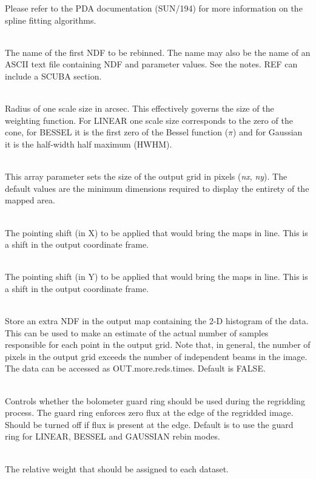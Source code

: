 \documentclass[twoside,11pt]{article}
\newcommand{\htmlref}[2]{#1}
\newcommand{\xref}[3]{#1}
\renewcommand{\_}{\texttt{\symbol{95}}}
\newcommand{\sstsubsection}[1]{ \item[{#1}] \mbox{} \\}
\newcommand{\sstsubsection}[1]{\item[{#1}]}
\begin{document}
{{{{         }
         Please refer to the PDA documentation 
         (\xref{SUN/194}{sun194}{}) for more information
         on the spline fitting algorithms.
      }
      \sstsubsection{
         REF = CHAR (Read)
      }{
         The name of the first NDF to be rebinned. The name may also be the
         name of an ASCII text file containing NDF and parameter values.
         See the notes. REF can include a \htmlref{SCUBA section}{sections}.
      }
      \sstsubsection{
         SCALE = REAL (Read)
      }{
         Radius of one scale size in arcsec. This effectively governs the
         size of the weighting function. For LINEAR one scale size corresponds
         to the zero of the cone, for BESSEL it is the first zero of the
         Bessel function ($\pi$) and for Gaussian it is the half-width
         half maximum (HWHM).
      }
      \sstsubsection{
         SIZE ( 2 ) = INTEGER (Read)
      }{
         This array parameter sets the size of the output grid in pixels
         (\textit{nx}, \textit{ny}). The default values are the minimum
         dimensions required to display the entirety of the mapped area.
      }
      \sstsubsection{
         SHIFT\_DX = REAL (Read)
      }{
         The pointing shift (in X) to be applied that would bring the
         maps in line. This is a shift in the output coordinate frame.
      }
      \sstsubsection{
         SHIFT\_DY = REAL (Read)
      }{
         The pointing shift (in Y) to be applied that would bring the
         maps in line. This is a shift in the output coordinate frame.
      }
      \sstsubsection{
         TIMES = LOGICAL (Read)
      }{
         Store an extra NDF in the output map containing the 2-D histogram
         of the data. This can be used to make an estimate of the actual
         number of samples responsible for each point in the output grid.
         Note that, in general, the number of pixels in the output grid
         exceeds the number of independent beams in the image.
         The data can be accessed as OUT.more.reds.times. Default is FALSE. 
      }
      \sstsubsection{
         USEGRD = LOGICAL (Read)
      }{
            Controls whether the bolometer guard ring should be used during
   the regridding process. The guard ring enforces zero flux at the
   edge of the regridded image. Should be turned off if flux is present
   at the edge. Default is to use the guard ring for LINEAR, BESSEL
   and GAUSSIAN rebin modes.
      }
      \sstsubsection{
         WEIGHT = REAL (Read)
      }{
         The relative weight that should be assigned to each dataset.
      }
}}
\end{document}
